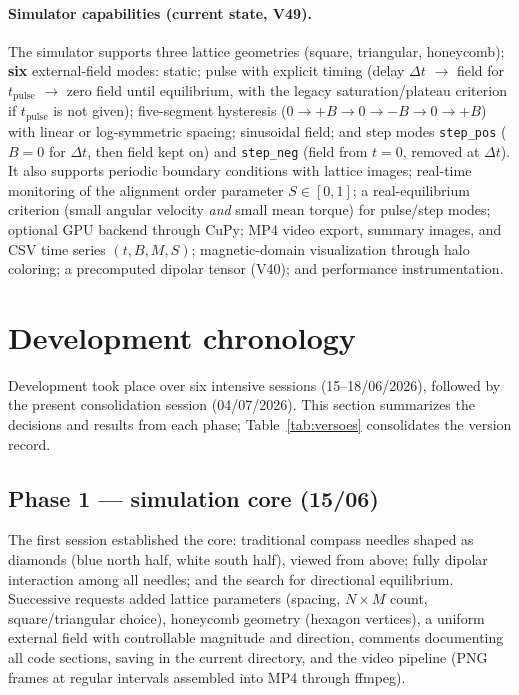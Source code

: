 \documentclass[11pt,a4paper]{article}
\newcommand{\code}[1]{\texttt{#1}}
\begin{document}
\paragraph{Simulator capabilities (current state, V49).}
The simulator supports three lattice geometries (square, triangular, honeycomb); \textbf{six} external-field modes: static; pulse with explicit timing (delay $\Delta t$ $\to$ field for $t_{\mathrm{pulse}}$ $\to$ zero field until equilibrium, with the legacy saturation/plateau criterion if $t_{\mathrm{pulse}}$ is not given); five-segment hysteresis ($0 \to +B \to 0 \to -B \to 0 \to +B$) with linear or log-symmetric spacing; sinusoidal field; and step modes \code{step\_pos} ($B{=}0$ for $\Delta t$, then field kept on) and \code{step\_neg} (field from $t{=}0$, removed at $\Delta t$). It also supports periodic boundary conditions with lattice images; real-time monitoring of the alignment order parameter $S \in [0,1]$; a real-equilibrium criterion (small angular velocity \emph{and} small mean torque) for pulse/step modes; optional GPU backend through CuPy; MP4 video export, summary images, and CSV time series $(t, B, M, S)$; magnetic-domain visualization through halo coloring; a precomputed dipolar tensor (V40); and performance instrumentation.

\section{Development chronology}

Development took place over six intensive sessions (15--18/06/2026), followed by the present consolidation session (04/07/2026). This section summarizes the decisions and results from each phase; Table~\ref{tab:versoes} consolidates the version record.

\subsection{Phase 1 --- simulation core (15/06)}

The first session established the core: traditional compass needles shaped as diamonds (blue north half, white south half), viewed from above; fully dipolar interaction among all needles; and the search for directional equilibrium. Successive requests added lattice parameters (spacing, $N \times M$ count, square/triangular choice), honeycomb geometry (hexagon vertices), a uniform external field with controllable magnitude and direction, comments documenting all code sections, saving in the current directory, and the video pipeline (PNG frames at regular intervals assembled into MP4 through ffmpeg).
\end{document}

